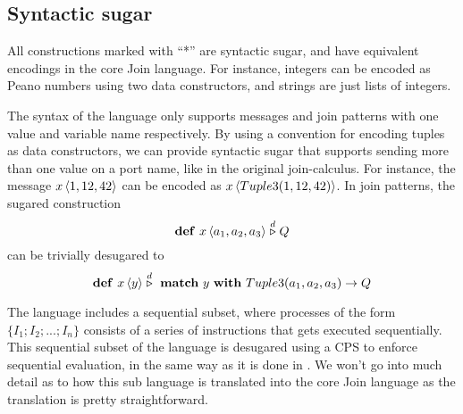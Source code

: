 \subsection{Syntactic sugar}
All constructions marked with ``*'' are syntactic sugar, and have equivalent
encodings in the core Join language. For instance, integers can be encoded as
Peano numbers using two data constructors, and strings are just lists of
integers.

The syntax of the language only supports messages and join patterns with one
value and variable name respectively. By using a convention for encoding tuples
as data constructors, we can provide syntactic sugar that supports sending more
than one value on a port name, like in the original join-calculus. For instance,
the message $\atm x<1, 12, 42>$ can be encoded as $\atm x<Tuple3(1, 12, 42)>$. In
join patterns, the sugared construction
\begin{equation*}
 \mathbf{def}~\atm x<a_1, a_2, a_3> \stackrel{d}{\triangleright} Q
\end{equation*}
can be trivially desugared to
\begin{equation*}
 \mathbf{def}~\atm x<y> \stackrel{d}{\triangleright} ~\mathbf{match}~ y
 ~\mathbf{with}~ Tuple3(a_1,a_2,a_3) \rightarrow Q
\end{equation*}

The language includes a sequential subset, where processes of the form $\{ I_1;
I_2;...;I_n\}$ consists of a series of instructions that gets executed
sequentially. This sequential subset of the language is desugared using a CPS to
enforce sequential evaluation, in the same way as it is done in
\cite{fournet1996reflexive}. We won't go into much detail as to how this sub
language is translated into the core Join language as the translation is pretty
straightforward.


